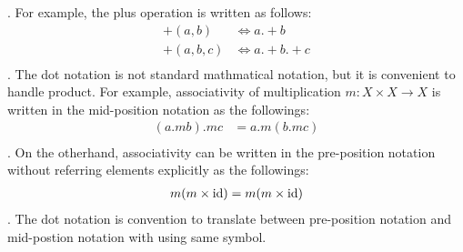 . For example, the plus operation is written as follows:
\begin{equation}\begin{split}
	+(a, b) &\Leftrightarrow a .+ b \\
	+(a, b, c) &\Leftrightarrow a .+ b .+ c \\
\end{split}\end{equation}
. The dot notation is not standard mathmatical notation, 
but it is convenient to handle product.
For example, associativity of multiplication $m:X\times X\to X$ is written 
in the mid-position notation as the followings:
\begin{equation}\begin{split}
	(a.m b).m c &= a.m (b.m c) \\
\end{split}\end{equation}
. On the otherhand, associativity can be written in the pre-position notation 
without referring elements explicitly as the followings:
\begin{equation}\begin{split}
	m(m\times {\operatorname{id}}) &= m(m\times {\operatorname{id}}) \\
\end{split}\end{equation}
. The dot notation is convention to translate between pre-position notation
and mid-postion notation with using same symbol.

